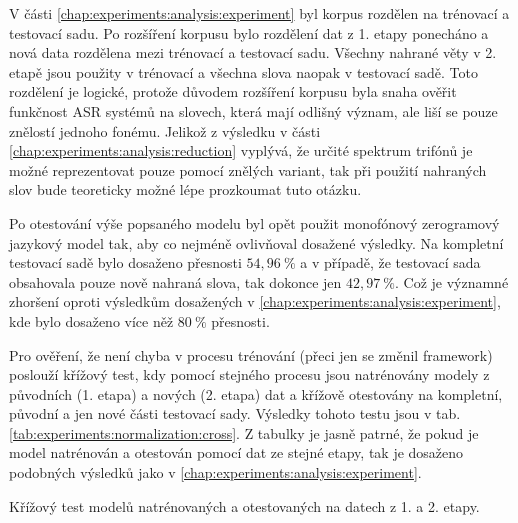 V části \ref{chap:experiments:analysis:experiment} byl korpus rozdělen na trénovací a testovací sadu. Po rozšíření korpusu bylo rozdělení dat z 1. etapy ponecháno a nová data rozdělena mezi trénovací a testovací sadu. Všechny nahrané věty v 2. etapě jsou použity v trénovací a všechna slova naopak v testovací sadě. Toto rozdělení je logické, protože důvodem rozšíření korpusu byla snaha ověřit funkčnost ASR systémů na slovech, která mají odlišný význam, ale liší se pouze znělostí jednoho fonému. Jelikož z výsledku v části \ref{chap:experiments:analysis:reduction} vyplývá, že určité spektrum trifónů je možné reprezentovat pouze pomocí znělých variant, tak při použití nahraných slov bude teoreticky možné lépe prozkoumat tuto otázku.

Po otestování výše popsaného modelu byl opět použit monofónový zerogramový jazykový model tak, aby co nejméně ovlivňoval dosažené výsledky. Na kompletní testovací sadě bylo dosaženo přesnosti $54,96\ \%$ a v případě, že testovací sada obsahovala pouze nově nahraná slova, tak dokonce jen $42,97\ \%$. Což je významné zhoršení oproti výsledkům dosažených v \ref{chap:experiments:analysis:experiment}, kde bylo dosaženo více něž $80\ \%$ přesnosti.

Pro ověření, že není chyba v procesu trénování (přeci jen se změnil framework) poslouží křížový test, kdy pomocí stejného procesu jsou natrénovány modely z původních (1. etapa) a nových (2. etapa) dat a křížově otestovány na kompletní, původní a jen nové části testovací sady. Výsledky tohoto testu jsou v tab. \ref{tab:experiments:normalization:cross}. Z tabulky je jasně patrné, že pokud je model natrénován a otestován pomocí dat ze stejné etapy, tak je dosaženo podobných výsledků jako v \ref{chap:experiments:analysis:experiment}.


\begin{table}[htpb]
  \centering
  \def\arraystretch{1.5}
  \caption{Křížový test modelů natrénovaných a otestovaných na datech z 1. a 2. etapy.}
  \label{tab:experiments:normalization:cross}
\end{table}

